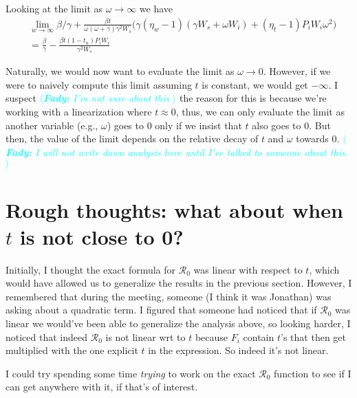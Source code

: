 \documentclass{article}
\newcommand{\fady}[1]{\textcolor{cyan}{$\langle${\slshape{\bfseries Fady:} #1 }$\rangle$}}
\newcommand{\Rnum}{\mathcal{R}_0}
\begin{document}
Looking at the limit as $\omega \rightarrow \infty$ we have
\begin{align}
&\lim_{w \rightarrow \infty} \beta/\gamma + \frac{\beta t}{\omega (\omega+\gamma) \gamma^2 W_s} \Big(\gamma(\eta_w-1)(\gamma W_s+\omega W_i) + (\eta_t -1)P_iW_i \omega^2 \Big) \nonumber \\
&= \frac{\beta}{\gamma} - \frac{\beta t\left(1-t_n\right)P_{i}W_{i}}{\gamma^{2}W_{s}}
\end{align}

Naturally, we would now want to evaluate the limit as $\omega \rightarrow 0$. However, if we were to naively compute this limit assuming $t$ is constant, we would get $- \infty$. I suspect \fady {I'm not sure about this} the reason for this is because we're working with a linearization where $t \approx 0$, thus, we can only evaluate the limit as another variable (e.g., $\omega$) goes to 0 only if we insist that $t$ also goes to 0. But then, the value of the limit depends on the relative decay of $t$ and $\omega$ towards 0. \fady{I will not write down analysis here until I've talked to someone about this.} 

\section{Rough thoughts: what about when $t$ is not close to 0?}

Initially, I thought the exact formula for $\Rnum$ was linear with respect to $t$, which would have allowed us to generalize the results in the previous section. However, I remembered that during the meeting, someone (I think it was Jonathan) was asking about a quadratic term. I figured that someone had noticed that if $\Rnum$ was linear we would've been able to generalize the analysis above, so looking harder, I noticed that indeed $\Rnum$ is not linear wrt to $t$ because $F_i$ contain $t$'s that then get multiplied with the one explicit $t$ in the expression. So indeed it's not linear.

I could try spending some time \emph{trying} to work on the exact $\Rnum$ function to see if I can get anywhere with it, if that's of interest. 
\end{document}
